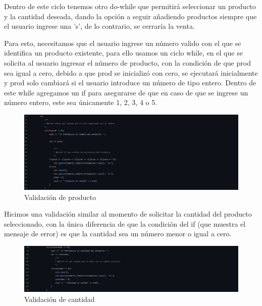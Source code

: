 \documentclass[12pt, letterpaper]{article}
\begin{document}
    Dentro de este ciclo tenemos otro do-while que permitirá seleccionar un producto y la cantidad deseada, dando la opción a seguir añadiendo productos siempre que el usuario ingrese una 's', de lo contrario, se cerraría la venta.
    
    Para esto, necesitamos que el usuario ingrese un número valido con el que se identifica un producto existente, para ello usamos un ciclo while, en el que se solicita al usuario ingresar el número de producto, con la condición de que prod sea igual a cero, debido a que prod se inicializó con cero, se ejecutará inicialmente y prod solo cambiará si el usuario introduce un número de tipo entero. Dentro de este while agregamos un if para asegurarse de que en caso de que se ingrese un número entero, este sea únicamente 1, 2, 3, 4 o 5.
    
    \begin{figure}[h]
    \centering
    \includegraphics[width=16cm]{validacion-producto.jpg}
    \caption {Validación de producto \label{fig:Fig7}}
    \end{figure}
    
    \vspace{0.8cm}
    
    Hicimos una validación similar al momento de solicitar la cantidad del producto seleccionado, con la única diferencia de que la condición del if (que muestra el mensaje de error) es que la cantidad sea un número menor o igual a cero.
    
    \begin{figure}[h]
    \centering
    \includegraphics[width=16cm]{validacion-cantidad.jpg}
    \caption {Validación de cantidad \label{fig:Fig8}}
    \end{figure}
\end{document}

